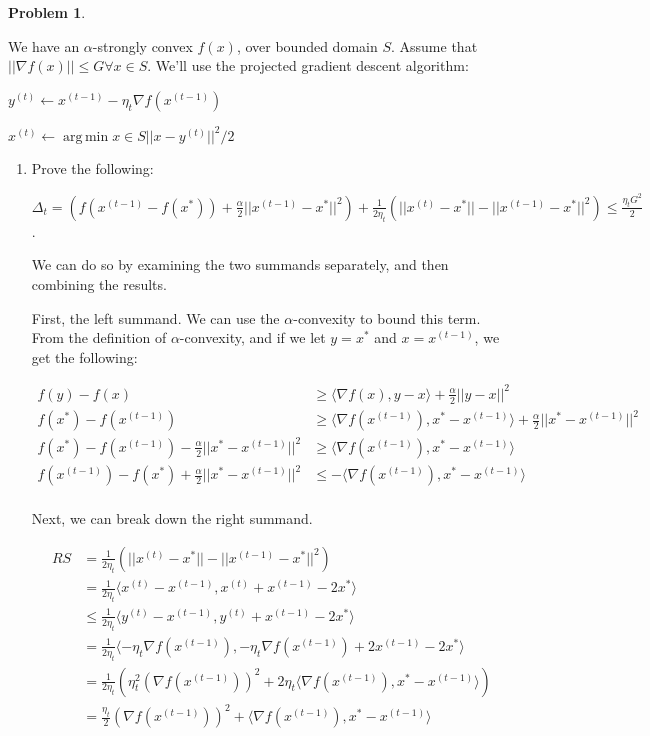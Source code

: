 \documentclass[11pt]{article}
\DeclareMathOperator*{\argmin}{arg\,min}
\theoremstyle{definition}
\theoremstyle{case}
\theoremstyle{theorem}
\newtheorem{prob}{Problem}
\begin{document}
\newpage

\begin{prob}
\end{prob}

We have an $\alpha$-strongly convex $f(x)$, over bounded domain $S$. Assume that $||\nabla f(x)|| \leq G \forall x \in S$. 
We'll use the projected gradient descent algorithm:

$y^{(t)} \longleftarrow x^{(t-1)} - \eta_t \nabla f(x^{(t-1)})$ 

$x^{(t)} \longleftarrow \argmin{x \in S} ||x - y^{(t)}||^2 / 2$

\begin{enumerate}[label=(\alph*)]

\item Prove the following:

$\Delta_t = \left(f(x^{(t-1)} - f(x^*)) + \frac{\alpha}{2} ||x^{(t-1)} - x^*||^2 \right) + \frac{1}{2 \eta_t} \left( ||x^{(t)} - x^* || - ||x^{(t-1)} - x^*||^2 \right) \leq \frac{\eta_t G^2}{2}$.

We can do so by examining the two summands separately, and then combining the results. 

First, the left summand. We can use the $\alpha$-convexity to bound this term. From the definition of 
$\alpha$-convexity, and if we let $y = x^*$ and $x = x^{(t-1)}$, we get the following:

\begin{align*}
f(y) - f(x) &\geq \langle \nabla f(x), y -x \rangle + \frac{\alpha}{2} ||y - x||^2 \\
f(x^*) - f(x^{(t-1)}) &\geq \langle \nabla f(x^{(t-1)}), x^* -x^{(t-1)} \rangle + \frac{\alpha}{2} ||x^* - x^{(t-1)}||^2 \\
f(x^*) - f(x^{(t-1)}) - \frac{\alpha}{2} ||x^* - x^{(t-1)}||^2 &\geq \langle \nabla f(x^{(t-1)}), x^* -x^{(t-1)} \rangle \\
f(x^{(t-1)}) - f(x^*) + \frac{\alpha}{2} ||x^* - x^{(t-1)}||^2 &\leq - \langle \nabla f(x^{(t-1)}), x^* -x^{(t-1)} \rangle \\
\end{align*}

Next, we can break down the right summand.

\begin{align*}
RS &= \frac{1}{2 \eta_t} \left( ||x^{(t)} - x^* || - ||x^{(t-1)} - x^*||^2 \right) \\ 
   &= \frac{1}{2 \eta_t} \langle x^{(t)} - x^{(t-1)},  x^{(t)} + x^{(t-1)} - 2 x^* \rangle \\ 
   &\leq \frac{1}{2 \eta_t} \langle y^{(t)} - x^{(t-1)},  y^{(t)} + x^{(t-1)} - 2 x^* \rangle \\ 
   &= \frac{1}{2 \eta_t} \langle - \eta_t \nabla f(x^{(t-1)}), - \eta_t \nabla f(x^{(t-1)}) + 2 x^{(t-1)} - 2 x^* \rangle \\ 
   &= \frac{1}{2 \eta_t} \left( \eta_t^2 (\nabla f(x^{(t-1)}))^2 + 2\eta_t \langle \nabla f(x^{(t-1)}), x^* - x^{(t-1)} \rangle \right)\\ 
   &= \frac{\eta_t}{2} (\nabla f(x^{(t-1)}))^2 + \langle \nabla f(x^{(t-1)}), x^* - x^{(t-1)} \rangle\\ 
\end{align*}


\end{enumerate}
\end{document}

